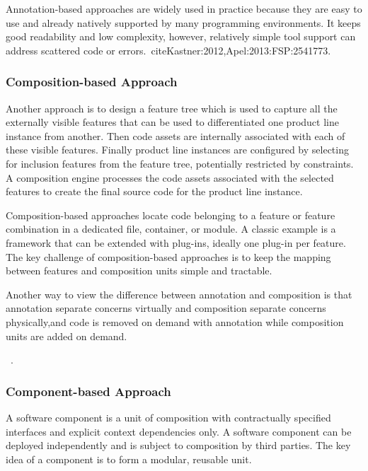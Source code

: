 Annotation-based approaches are widely used in practice because they are
easy to use and already natively supported by many programming
environments. It keeps good readability and low complexity, however,
relatively simple tool support can address scattered code or
errors.~cite{Kastner:2012,Apel:2013:FSP:2541773}.


\subsubsection{Composition-based Approach}

Another approach is to design a feature tree which is used to capture all the externally visible features that
can be used to differentiated one product line instance from another. Then code assets are internally associated
 with each of these visible features. Finally product line instances are configured by selecting for inclusion
  features from the feature tree, potentially restricted by constraints. A composition engine processes the
  code assets associated with the selected features to create the final source code for the product line instance.

Composition-based approaches locate code belonging to a feature or feature combination in a dedicated file,
container, or module. A classic example is a framework that can be extended with plug-ins, ideally one plug-in
per feature. The key challenge of composition-based approaches is to keep the mapping between features and
composition units simple and tractable.

Another way to view the difference between annotation and composition is that annotation separate concerns
virtually and composition separate concerns physically,and code is removed on demand with annotation while
composition units are added on demand.

~\cite{Thum:2014:FEF:2537169.2537315,Apel:2013:FSP:2541773,Schaefer:2010:DPS:1885639.1885647
,Dhungana:2011:DMD:1924082.1924092,Heineman:2015:TMO:2791060.2791076,Batory2004FeatureorientedPA,
leich2005tool,Setyautami:2016:UPD:2934466.2934479,Ddder2013UsingII,Apel:2009:FLA:1555001.1555038,
proksch2014tool}.

\subsubsection{Component-based Approach}

A software component is a unit of composition with contractually specified interfaces and explicit context
dependencies only. A software component can be deployed independently and is subject to composition by third
parties. The key idea of a component is to form a modular, reusable unit.

